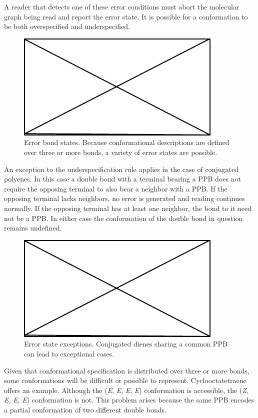 \documentclass{article}
\begin{document}
A reader that detects one of these error conditions must abort the molecular graph being read and report the error state. It is possible for a conformation to be both overspecified and underspecified.

\begin{figure}
    \centering
    \includegraphics{filler}
    \caption{Error bond states. Because conformational descriptions are defined over three or more bonds, a variety of error states are possible.}
    \label{fig:bond-error-states}
\end{figure}

An exception to the underspecification rule applies in the case of conjugated polyenes. In this case a double bond with a terminal bearing a PPB does not require the opposing terminal to also bear a neighbor with a PPB. If the opposing terminal lacks neighbors, no error is generated and reading continues normally. If the opposing terminal has at least one neighbor, the bond to it need not be a PPB. In either case the conformation of the double bond in question remains undefined.

\begin{figure}
    \centering
    \includegraphics{filler}
    \caption{Error state exceptions. Conjugated dienes sharing a common PPB can lead to exceptional cases.}
    \label{fig:bond-error-state-exceptions}
\end{figure}

Given that conformational specification is distributed over three or more bonds, some conformations will be difficult or possible to represent. Cyclooctatetraene offers an example. Although the (\textit{E}, \textit{E}, \textit{E}, \textit{E}) conformation is accessible, the (\textit{Z}, \textit{E}, \textit{E}, \textit{E}) conformation is not. This problem arises because the same PPB encodes a partial conformation of two different double bonds.
\end{document}
